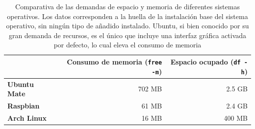 

\begin{table}[H]
\centering
\begin{tabular}{|l|r|r|}
\hline
&\textbf{Consumo de memoria (\texttt{free -m})} &\textbf{Espacio ocupado (\texttt{df -h})}\\
\hline
\textbf{Ubuntu Mate}&702 MB&2.5 GB\\
\hline
\textbf{Raspbian}&61 MB&2.4 GB\\
\hline
\textbf{Arch Linux}&16 MB&400 MB\\
\hline
\end{tabular}
\caption[Comparativa de las demandas de espacio y memoria de diferentes sistemas operativos]{Comparativa de las demandas de espacio y memoria de diferentes sistemas operativos. Los datos corresponden a la huella de la instalación base del sistema operativo, sin ningún tipo de añadido instalado. Ubuntu, si bien conocido por su gran demanda de recursos, es el único que incluye una interfaz gráfica activada por defecto, lo cual eleva el consumo de memoria}
\label{os:footprint}
\end{table}



